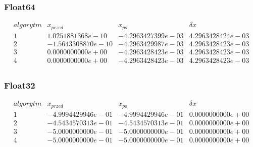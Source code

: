 \subsubsection*{Float64}
$$
\begin{array}{c|c|c|c|c}
algorytm & x_{przed} & x_{po} & \delta x\\
\hline
1 & 1.0251881368e-10 & -4.2963427399e-03 & 4.2963428424e-03 \\
2 & -1.5643308870e-10 & -4.2963429987e-03 & 4.2963428423e-03 \\
3 & 0.0000000000e+00 & -4.2963428423e-03 & 4.2963428423e-03 \\
4 & 0.0000000000e+00 & -4.2963428423e-03 & 4.2963428423e-03 \\
\end{array}
$$
\subsubsection*{Float32}
$$
\begin{array}{c|c|c|c|c}
algorytm & x_{przed} & x_{po} & \delta x\\
\hline
1 & -4.9994429946e-01 & -4.9994429946e-01 & 0.0000000000e+00 \\
2 & -4.5434570313e-01 & -4.5434570313e-01 & 0.0000000000e+00 \\
3 & -5.0000000000e-01 & -5.0000000000e-01 & 0.0000000000e+00 \\
4 & -5.0000000000e-01 & -5.0000000000e-01 & 0.0000000000e+00 \\
\end{array}
$$

